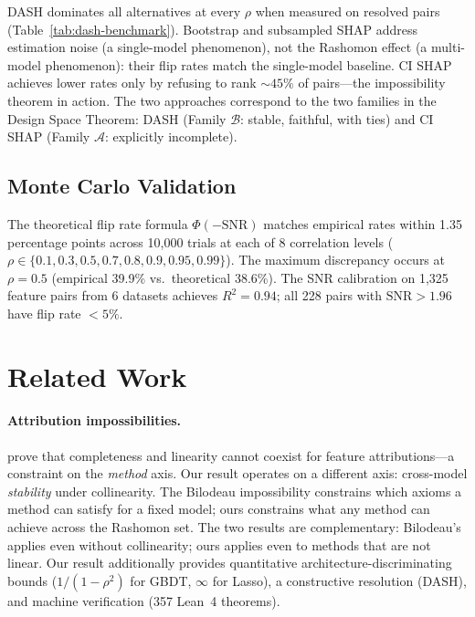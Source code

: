 DASH dominates all alternatives at every $\rho$ when measured on resolved pairs (Table~\ref{tab:dash-benchmark}). Bootstrap and subsampled SHAP address estimation noise (a single-model phenomenon), not the Rashomon effect (a multi-model phenomenon): their flip rates match the single-model baseline. CI SHAP achieves lower rates only by refusing to rank ${\sim}45\%$ of pairs---the impossibility theorem in action. The two approaches correspond to the two families in the Design Space Theorem: DASH (Family $\mathcal{B}$: stable, faithful, with ties) and CI SHAP (Family $\mathcal{A}$: explicitly incomplete).

\subsection{Monte Carlo Validation}

The theoretical flip rate formula $\Phi(-\text{SNR})$ matches empirical rates within 1.35 percentage points across 10,000 trials at each of 8 correlation levels ($\rho \in \{0.1, 0.3, 0.5, 0.7, 0.8, 0.9, 0.95, 0.99\}$). The maximum discrepancy occurs at $\rho = 0.5$ (empirical 39.9\% vs.\ theoretical 38.6\%). The SNR calibration on 1,325 feature pairs from 6 datasets achieves $R^2 = 0.94$; all 228 pairs with $\text{SNR} > 1.96$ have flip rate $< 5\%$.



\section{Related Work}
\label{sec:related}

\paragraph{Attribution impossibilities.}
\citet{bilodeau2024impossibility} prove that completeness and linearity cannot coexist for feature attributions---a constraint on the \emph{method} axis. Our result operates on a different axis: cross-model \emph{stability} under collinearity. The Bilodeau impossibility constrains which axioms a method can satisfy for a fixed model; ours constrains what any method can achieve across the Rashomon set. The two results are complementary: Bilodeau's applies even without collinearity; ours applies even to methods that are not linear. Our result additionally provides quantitative architecture-discriminating bounds ($1/(1-\rho^2)$ for GBDT, $\infty$ for Lasso), a constructive resolution (DASH), and machine verification (357 Lean~4 theorems).

